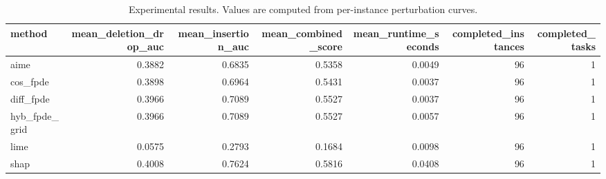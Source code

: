 \begin{table}[t]
\caption{Experimental results. Values are computed from per-instance perturbation curves.}
\label{tab:main_results_computed}
\centering
\begin{tabular}{lrrrrrr}
\toprule
method & mean\_deletion\_drop\_auc & mean\_insertion\_auc & mean\_combined\_score & mean\_runtime\_seconds & completed\_instances & completed\_tasks \\
\midrule
aime & 0.3882 & 0.6835 & 0.5358 & 0.0049 & 96 & 1 \\
cos\_fpde & 0.3898 & 0.6964 & 0.5431 & 0.0037 & 96 & 1 \\
diff\_fpde & 0.3966 & 0.7089 & 0.5527 & 0.0037 & 96 & 1 \\
hyb\_fpde\_grid & 0.3966 & 0.7089 & 0.5527 & 0.0057 & 96 & 1 \\
lime & 0.0575 & 0.2793 & 0.1684 & 0.0098 & 96 & 1 \\
shap & 0.4008 & 0.7624 & 0.5816 & 0.0408 & 96 & 1 \\
\bottomrule
\end{tabular}

\end{table}
